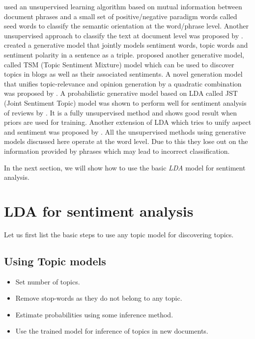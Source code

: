 \citep*{turney2002thumbs} used an unsupervised learning algorithm based on mutual information between document phrases and a small set of positive/negative paradigm words 
called seed words to classify the semantic orientation at the word/phrase level. Another unsupervised approach to classify the text at document level was proposed by \citep*{turney2002unsupervised}. 
\citep*{eguchi2006sentiment} created a generative model that jointly models sentiment words, topic words and sentiment polarity in a sentence as a triple. \citep*{mei2007topic} 
proposed another generative model, called TSM (Topic Sentiment Mixture) model which can be used to discover topics in blogs as well as their associated sentiments. A novel 
generation model that unifies topic-relevance and opinion generation by a quadratic combination was proposed by \citep*{zhang2008generation}. A probabilistic generative model 
based on LDA called JST (Joint Sentiment Topic) model was shown to perform well for sentiment analysis of reviews by \citep*{lin2009joint}. It is a fully unsupervised method
and shows good result when priors are used for training. Another extension of LDA which tries to unify aspect and sentiment was proposed by \citep*{jo2011aspect}. All the 
unsupervised methods using generative models discussed here operate at the word level. Due to this they lose out on the information provided by phrases which may lead to 
incorrect classification.

In the next section, we will show how to use the basic \textit{LDA} model for sentiment analysis.

\section{LDA for sentiment analysis}

Let us first list the basic steps to use any topic model for discovering topics.

\subsection{Using Topic models}

\begin{itemize}
 \item Set number of topics.
 \item Remove stop-words as they do not belong to any topic.
 \item Estimate probabilities using some inference method.
 \item Use the trained model for inference of topics in new documents.
\end{itemize}

